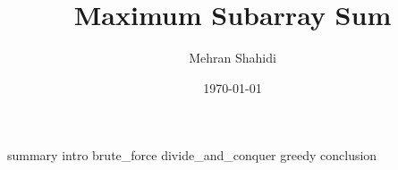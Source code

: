 \documentclass{article}
\title{Maximum Subarray Sum}
\author{Mehran Shahidi}
\date{\today}
\begin{document}
\maketitle
{}
{summary}
\newpage
\tableofcontents
\newpage
{}
{intro}
{brute_force}
{divide_and_conquer}
{greedy}
{conclusion}

\newpage
\end{document}

